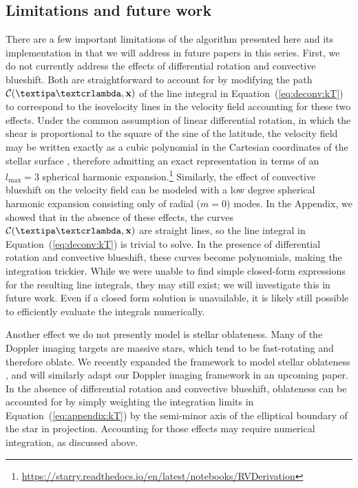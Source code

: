 \documentclass[modern]{aastex631}
\begin{document}
\subsection{Limitations and future work}
\label{sec:discussion:caveats}

There are a few important limitations of the algorithm presented here and its implementation in \starry that we will address in future papers in this series.
First, we do not currently address the effects of differential rotation and convective blueshift.
Both are straightforward to account for by modifying the path $\mathcal{C}(\lnlam,\bvec{x})$ of the line integral in Equation~(\ref{eq:deconv:kT}) to correspond to the isovelocity lines in the velocity field accounting for these two effects.
Under the common assumption of linear differential rotation, in which the shear is proportional to the square of the sine of the latitude, the velocity field may be written exactly as a cubic polynomial in the Cartesian coordinates of the stellar surface \citep{Short2018}, therefore admitting an exact representation in terms of an $l_\mathrm{max} = 3$ spherical harmonic expansion.\footnote{\url{https://starry.readthedocs.io/en/latest/notebooks/RVDerivation}}
Similarly, the effect of convective blueshift on the velocity field can be modeled with a low degree spherical harmonic expansion consisting only of radial ($m = 0$) modes.
In the Appendix, we showed that in the absence of these effects, the curves $\mathcal{C}(\lnlam,\bvec{x})$ are straight lines, so the line integral in Equation~(\ref{eq:deconv:kT}) is trivial to solve.
In the presence of differential rotation and convective blueshift, these curves become polynomials, making the integration trickier.
While we were unable to find simple closed-form expressions for the resulting line integrals, they may still exist; we will investigate this in future work.
Even if a closed form solution is unavailable, it is likely still possible to efficiently evaluate the integrals numerically.

Another effect we do not presently model is stellar oblateness.
Many of the Doppler imaging targets are massive stars, which tend to be fast-rotating and therefore oblate.
We recently expanded the \starry framework to model stellar oblateness \citet{Dholakia2021}, and will similarly adapt our Doppler imaging framework in an upcoming paper. 
In the absence of differential rotation and convective blueshift, oblateness can be accounted for by simply weighting the integration limits in Equation~(\ref{eq:appendix:kT}) by the semi-minor axis of the elliptical boundary of the star in projection. 
Accounting for those effects may require numerical integration, as discussed above.
\end{document}
